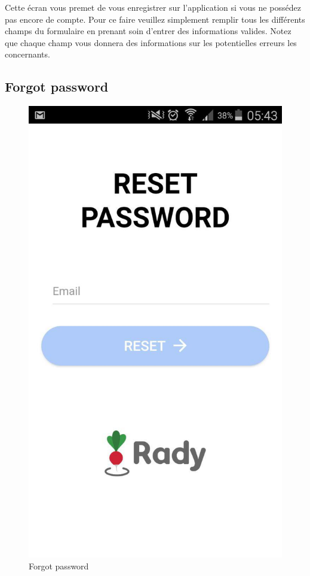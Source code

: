 \documentclass[french]{article}
\begin{document}
	Cette écran vous premet de vous enregistrer sur l'application si vous ne possédez pas encore de compte. Pour ce faire veuillez simplement remplir tous les différents champs du formulaire en prenant soin d'entrer des informations valides. Notez que chaque champ vous donnera des informations sur les potentielles erreurs les concernants.
	
	\subsection{Forgot password}
	\begin{figure}[H]
		\centering
		\includegraphics[scale=0.4]{../screenshot/screenshot-reset-password}
		\caption{Forgot password}
		\label{Forgot password}
	\end{figure} 
	
\end{document}
